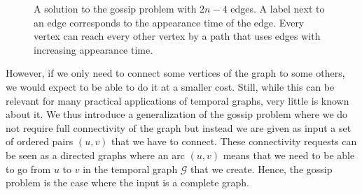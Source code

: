 \documentclass[11pt]{article}%
\begin{document}
\begin{figure}[t]
\begin{center}
\end{center}
\caption{A solution to the gossip problem with $2n-4$ edges. A label next to an edge corresponds to the appearance time of the edge. Every vertex can reach every other vertex by a path that uses edges with increasing appearance time.}
\label{fig:2n-4}
\end{figure}



However, if we only need to connect some vertices of the graph to some others, we would expect to be able to do it at a smaller cost. Still, while this can be relevant for many practical applications of temporal graphs, very little is known about it. We thus introduce a generalization of the gossip problem where we do not require full connectivity of the graph but instead we are given as input a set of ordered pairs $(u,v)$ that we have to connect. These connectivity requests can be seen as a directed graphs where an arc $(u,v)$ means that we need to be able to go from $u$ to $v$ in the temporal graph $\mathcal G$ that we create. Hence, the gossip problem is the case where the input is a complete graph.\\
\end{document}
